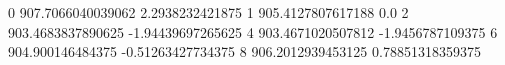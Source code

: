 0 907.7066040039062 2.2938232421875
1 905.4127807617188 0.0
2 903.4683837890625 -1.94439697265625
4 903.4671020507812 -1.9456787109375
6 904.900146484375 -0.51263427734375
8 906.2012939453125 0.78851318359375
